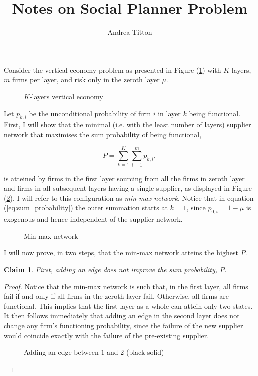 \documentclass[american, abstract=on]{scrartcl}
\author{Andrea Titton}
\title{Notes on Social Planner Problem}
\newcommand{\inputTikZ}[2]{%
    \scalebox{#1}{}  
    }
\theoremstyle{plain}
\newtheorem{claim}{Claim}
\begin{document}
\maketitle

Consider the vertical economy problem as presented in Figure (\ref{fig:vertical-economy-diagram}) with $K$ layers, $m$ firms per layer, and risk only in the zeroth layer $\mu$.

\begin{figure}[H]
    \centering
    \inputTikZ{0.5}{../diagrams/model-presentation.tikz} 
    \caption{$K$-layers vertical economy}
    \label{fig:vertical-economy-diagram}
\end{figure}

Let $p_{k, i}$ be the unconditional probability of firm $i$ in layer $k$ being functional. First, I will show that the minimal (i.e. with the least number of layers) supplier network that maximises the sum probability of being functional,

\begin{equation} \label{eq:sum_probability}
    P = \sum^{K}_{k = 1} \sum^m_{i = 1} p_{k, i},
\end{equation}

is atteined by firms in the first layer sourcing from all the firms in zeroth layer and firms in all subsequent layers having a single supplier, as displayed in Figure (\ref{fig:maximal-probability-diagram}). I will refer to this configuration as \textit{min-max network}. Notice that in equation (\ref{eq:sum_probability}) the outer summation starts at $k = 1$, since $p_{0, i} = 1 - \mu$ is exogenous and hence independent of the supplier network.

\begin{figure}[H]
    \centering
    \inputTikZ{0.6}{../diagrams/maximum-probability.tikz}
    \caption{Min-max network} \label{fig:maximal-probability-diagram} 
\end{figure} 

I will now prove, in two steps, that the min-max network atteins the highest $P$. 

\begin{claim} \label{claim:min-max:first}
    First, adding an edge does not improve the sum probability, $P$. \end{claim} \begin{proof}
    Notice that the min-max network is such that, in the first layer, all firms fail if and only if all firms in the zeroth layer fail. Otherwise, all firms are functional. This implies that the first layer as a whole can attein only two states. It then follows immediately that adding an edge in the second layer does not change any firm's functioning probability, since the failure of the new supplier would coincide exactly with the failure of the pre-existing supplier. 
    
    \begin{figure}[H]
        \centering
        \inputTikZ{0.6}{../diagrams/adding-an-edge.tikz}
        \caption{Adding an edge between $1$ and $2$ (black solid)} \label{fig:adding-an-edge} 
    \end{figure} 

    
\end{proof}
\end{document}
